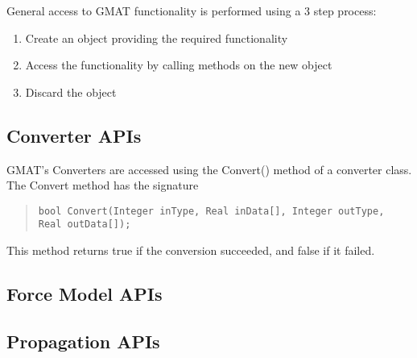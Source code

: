 \documentclass[10pt,letterpaper,titlepage]{article}
\begin{document}
General access to GMAT functionality is performed using a 3 step process:

\begin{enumerate}
\item Create an object providing the required functionality
\item Access the functionality by calling methods on the new object
\item Discard the object 
\end{enumerate}

\subsection{Converter APIs}

GMAT's Converters are accessed using the Convert() method of a converter class.  The Convert method has the signature
\begin{quote}
\begin{verbatim}
bool Convert(Integer inType, Real inData[], Integer outType, Real outData[]);
\end{verbatim}
\end{quote}

\noindent This method returns true if the conversion succeeded, and false if it failed.

\subsection{Force Model APIs}

\subsection{Propagation APIs}
\end{document}
